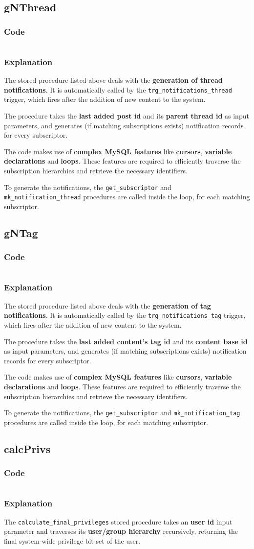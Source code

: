 \documentclass[12pt]{report}
\renewcommand\emph{\textbf}
\newcommand{\printSQLtest}[1]
{
    \inputminted[linenos, breaklines, breakbytoken, tabsize=4, fontsize=\footnotesize]{mysql}{#1}
}
\newcommand{\printSQLTablepage}[2]
{    
    \subsection{#2}
    \subsubsection{Code}
    \printSQLtest{../sql/parts/#1}
    \subsubsection{Explanation}
}
\begin{document}
                \newpage

                \printSQLTablepage{26_procGNThread.sql}{gNThread}
                    The stored procedure listed above deals with the \emph{generation of thread notifications}. It is automatically called by the \texttt{trg_notifications_thread} trigger, which fires after the addition of new content to the system.

                    The procedure takes the \emph{last added post id} and its \emph{parent thread id} as input parameters, and generates (if matching subscriptions exists) notification records for every subscriptor.

                    The code makes use of \emph{complex MySQL features} like \emph{cursors}, \emph{variable declarations} and \emph{loops}.
                    These features are required to efficiently traverse the subscription hierarchies and retrieve the necessary identifiers.

                    To generate the notifications, the \texttt{get_subscriptor} and \texttt{mk_notification_thread} procedures are called inside the loop, for each matching subscriptor.

                \newpage

                \printSQLTablepage{27_procGNTag.sql}{gNTag}
                    The stored procedure listed above deals with the \emph{generation of tag notifications}. It is automatically called by the \texttt{trg_notifications_tag} trigger, which fires after the addition of new content to the system.

                    The procedure takes the \emph{last added content's tag id} and its \emph{content base id} as input parameters, and generates (if matching subscriptions exists) notification records for every subscriptor.

                    The code makes use of \emph{complex MySQL features} like \emph{cursors}, \emph{variable declarations} and \emph{loops}.
                    These features are required to efficiently traverse the subscription hierarchies and retrieve the necessary identifiers.

                    To generate the notifications, the \texttt{get_subscriptor} and \texttt{mk_notification_tag} procedures are called inside the loop, for each matching subscriptor.

                \newpage

                \printSQLTablepage{28_procCalcPrivs.sql}{calcPrivs}
                    The \texttt{calculate_final_privileges} stored procedure takes an \emph{user id} input parameter and traverses its \emph{user/group hierarchy} recursively, returning the final system-wide privilege bit set of the user.
\end{document}
